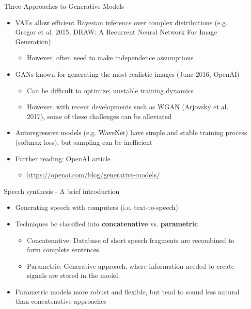 \documentclass{beamer}
\begin{document}
  \begin{frame}{Three Approaches to Generative Models}
    \begin{itemize}
      \item VAEs allow efficient Bayesian inference over complex distributions (e.g. Gregor et al. 2015, DRAW: A Recurrent Neural Network For Image Generation)

        \begin{itemize}
          \item However, often need to make independence assumptions
        \end{itemize}
      \item GANs known for generating the most realistic images (June 2016, OpenAI)
        \begin{itemize}
          \item Can be difficult to optimize; unstable training dynamics
          \item However, with recent developments such as WGAN (Arjovsky et al. 2017), some of these challenges can be alleviated
        \end{itemize}
      \item Autoregressive models (e.g. WaveNet) have simple and stable training process (softmax loss), but sampling can be inefficient
      \item Further reading: OpenAI article
        \begin{itemize}
          \item \url{https://openai.com/blog/generative-models/}
        \end{itemize}
    \end{itemize}
  \end{frame}

  \begin{frame}{Speech synthesis - A brief introduction}
    \begin{itemize}
      \item Generating speech with computers (i.e. text-to-speech)
      \item Techniques be classified into \textbf{concatenative} vs. \textbf{parametric}
        \begin{itemize}
          \item Concatenative: Database of short speech fragments are recombined to form complete sentences.
          \item Parametric: Generative approach, where information needed to create signals are stored in the model.
        \end{itemize}
      \item Parametric models more robust and flexible, but tend to sound less natural than concatenative approaches
    \end{itemize}
  \end{frame}
\end{document}
